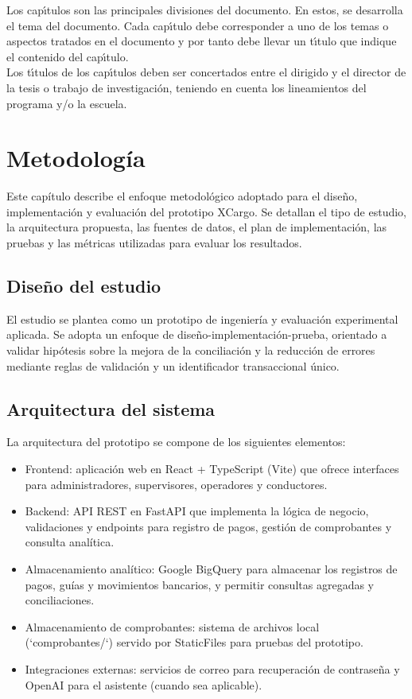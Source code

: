 Los cap\'{\i}tulos son las principales divisiones del documento. En estos, se desarrolla el tema del documento. Cada cap\'{\i}tulo debe corresponder a uno de los temas o aspectos tratados en el documento y por tanto debe llevar un t\'{\i}tulo que indique el contenido del cap\'{\i}tulo.\\

Los t\'{\i}tulos de los cap\'{\i}tulos deben ser concertados entre el dirigido y el director de la tesis  o trabajo de investigaci\'{o}n, teniendo en cuenta los lineamientos del programa y/o la escuela.\\

\chapter{Metodología}

Este capítulo describe el enfoque metodológico adoptado para el diseño, implementación y evaluación del prototipo XCargo. Se detallan el tipo de estudio, la arquitectura propuesta, las fuentes de datos, el plan de implementación, las pruebas y las métricas utilizadas para evaluar los resultados.

\section{Diseño del estudio}
El estudio se plantea como un prototipo de ingeniería y evaluación experimental aplicada. Se adopta un enfoque de diseño-implementación-prueba, orientado a validar hipótesis sobre la mejora de la conciliación y la reducción de errores mediante reglas de validación y un identificador transaccional único.

\section{Arquitectura del sistema}
La arquitectura del prototipo se compone de los siguientes elementos:
\begin{itemize}
	\item Frontend: aplicación web en React + TypeScript (Vite) que ofrece interfaces para administradores, supervisores, operadores y conductores.
	\item Backend: API REST en FastAPI que implementa la lógica de negocio, validaciones y endpoints para registro de pagos, gestión de comprobantes y consulta analítica.
	\item Almacenamiento analítico: Google BigQuery para almacenar los registros de pagos, guías y movimientos bancarios, y permitir consultas agregadas y conciliaciones.
	\item Almacenamiento de comprobantes: sistema de archivos local (`comprobantes/`) servido por StaticFiles para pruebas del prototipo.
	\item Integraciones externas: servicios de correo para recuperación de contraseña y OpenAI para el asistente (cuando sea aplicable).
\end{itemize}

